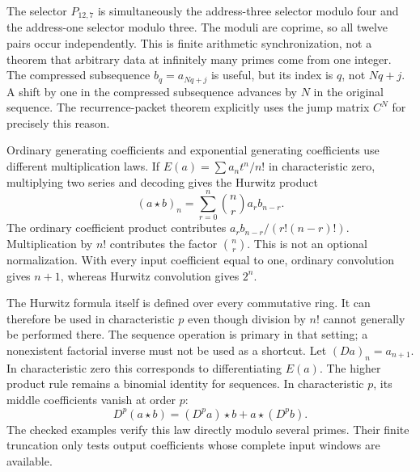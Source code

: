 The selector $P_{12,7}$ is simultaneously the address-three selector modulo four and the address-one selector modulo three. The moduli are coprime, so all twelve pairs occur independently. This is finite arithmetic synchronization, not a theorem that arbitrary data at infinitely many primes come from one integer.
The compressed subsequence $b_q=a_{Nq+j}$ is useful, but its index is $q$, not $Nq+j$. A shift by one in the compressed subsequence advances by $N$ in the original sequence. The recurrence-packet theorem explicitly uses the jump matrix $C^N$ for precisely this reason.

Ordinary generating coefficients and exponential generating coefficients use different multiplication laws. If $E(a)=\sum a_nt^n/n!$ in characteristic zero, multiplying two series and decoding gives the Hurwitz product
\[
 (a\star b)_n=\sum_{r=0}^n\binom nr a_rb_{n-r}.
\]
The ordinary coefficient product contributes $a_rb_{n-r}/(r!(n-r)!)$. Multiplication by $n!$ contributes the factor $\binom nr$. This is not an optional normalization. With every input coefficient equal to one, ordinary convolution gives $n+1$, whereas Hurwitz convolution gives $2^n$.

The Hurwitz formula itself is defined over every commutative ring. It can therefore be used in characteristic $p$ even though division by $n!$ cannot generally be performed there. The sequence operation is primary in that setting; a nonexistent factorial inverse must not be used as a shortcut.
Let $(Da)_n=a_{n+1}$. In characteristic zero this corresponds to differentiating $E(a)$. The higher product rule remains a binomial identity for sequences. In characteristic $p$, its middle coefficients vanish at order $p$:
\[
 D^p(a\star b)=(D^pa)\star b+a\star(D^pb).
\]
The checked examples verify this law directly modulo several primes. Their finite truncation only tests output coefficients whose complete input windows are available.

